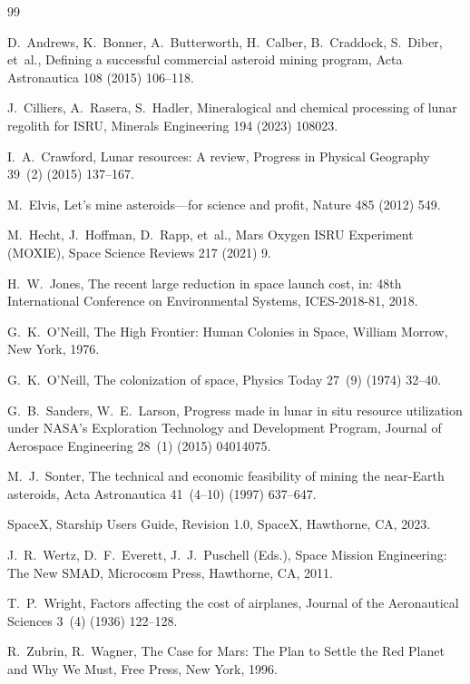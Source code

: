\documentclass[preprint,12pt]{elsarticle}
\begin{document}
\begin{thebibliography}{99}

D.~Andrews, K.~Bonner, A.~Butterworth, H.~Calber, B.~Craddock, S.~Diber, et~al.,
\newblock Defining a successful commercial asteroid mining program,
\newblock Acta Astronautica 108 (2015) 106--118.

J.~Cilliers, A.~Rasera, S.~Hadler,
\newblock Mineralogical and chemical processing of lunar regolith for ISRU,
\newblock Minerals Engineering 194 (2023) 108023.

I.~A.~Crawford,
\newblock Lunar resources: A review,
\newblock Progress in Physical Geography 39~(2) (2015) 137--167.

M.~Elvis,
\newblock Let's mine asteroids---for science and profit,
\newblock Nature 485 (2012) 549.

M.~Hecht, J.~Hoffman, D.~Rapp, et~al.,
\newblock Mars Oxygen ISRU Experiment (MOXIE),
\newblock Space Science Reviews 217 (2021) 9.

H.~W.~Jones,
\newblock The recent large reduction in space launch cost,
\newblock in: 48th International Conference on Environmental Systems, ICES-2018-81, 2018.

G.~K.~O'Neill,
\newblock The High Frontier: Human Colonies in Space,
\newblock William Morrow, New York, 1976.

G.~K.~O'Neill,
\newblock The colonization of space,
\newblock Physics Today 27~(9) (1974) 32--40.

G.~B.~Sanders, W.~E.~Larson,
\newblock Progress made in lunar in situ resource utilization under NASA's Exploration Technology and Development Program,
\newblock Journal of Aerospace Engineering 28~(1) (2015) 04014075.

M.~J.~Sonter,
\newblock The technical and economic feasibility of mining the near-Earth asteroids,
\newblock Acta Astronautica 41~(4--10) (1997) 637--647.

SpaceX,
\newblock Starship Users Guide, Revision 1.0,
\newblock SpaceX, Hawthorne, CA, 2023.

J.~R.~Wertz, D.~F.~Everett, J.~J.~Puschell (Eds.),
\newblock Space Mission Engineering: The New SMAD,
\newblock Microcosm Press, Hawthorne, CA, 2011.

T.~P.~Wright,
\newblock Factors affecting the cost of airplanes,
\newblock Journal of the Aeronautical Sciences 3~(4) (1936) 122--128.

R.~Zubrin, R.~Wagner,
\newblock The Case for Mars: The Plan to Settle the Red Planet and Why We Must,
\newblock Free Press, New York, 1996.

\end{thebibliography}
\end{document}
